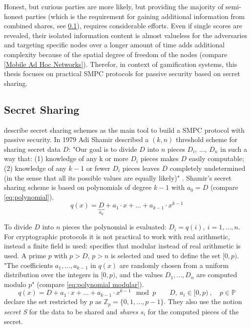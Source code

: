Honest, but curious parties are more likely, but providing the majority of semi-honest parties (which is the requirement for gaining additional information from combined shares, see \ref{Secret Sharing}), requires considerable efforts. Even if single scores are revealed, their isolated information content is almost valueless for the adversaries and targeting specific nodes over a longer amount of time adds additional complexity because of the spatial degree of freedom of the nodes (compare \ref{Mobile Ad Hoc Networks}).
Therefor, in context of gamification systems, this thesis focuses on practical \gls{SMPC} protocols for passive security based on secret sharing.

\subsection{Secret Sharing}	\label{Secret Sharing}

\textcite[p. 32]{Cramer2015} describe secret sharing schemes as the main tool to build a \gls{SMPC} protocol with passive security. In 1979 Adi Shamir described a $(k, n)$ threshold scheme for sharing secret data $D$: "Our goal is to divide $D$ into $n$ pieces $D_i$, ..., $D_n$ in such a way that:
(1) knowledge of any k or more $D_i$ pieces makes $D$ easily computable; (2) knowledge of any $k-1$ or fewer $D_i$ pieces leaves $D$ completely undetermined (in the sense that all its possible values are equally likely)" \autocite{Shamir1979}.
Shamir's secret sharing scheme is based on polynomials of degree $k-1$ with $a_0=D$ (compare \ref{eq:polynomial}). 
\begin{equation}
\label{eq:polynomial}
q(x)=\underbrace{D}_{a_0} + a_1 \cdot x + ... + a_{k-1} \cdot x^{k-1}
\end{equation}

To divide $D$ into $n$ pieces the polynomial is evaluated: $D_i=q(i),\ i=1,...,n$. For cryptographic protocols it is not practical to work with real arithmetic, instead a finite field is used: \textcite{Shamir1979} specifies that modular instead of real arithmetic is used. A prime $p$ with $p>D$, $p>n$ is selected and used to define the set $[0, p)$. "The coefficients $a_1, ..., a_{k-1}$ in $q(x)$ are randomly chosen	from a uniform distribution over the integers in $[0, p)$, and the values $D_1, ..., D_n$ are computed modulo $p$" \autocite[p. 613]{Shamir1979} (compare \ref{eq:polynomial modular}).
\begin{equation}
\label{eq:polynomial modular}
q(x) = D + a_1 \cdot x + ... + a_{k-1} \cdot x^{k-1} \mod p \qquad D,\ a_i \in [0,p)\ , \quad p \in \mathbb{P}
\end{equation}
\textcite[p. 7]{Cramer2015} declare the set restricted by $p$ as $\mathbb{Z}_p = \{0, 1, ..., p-1\}$. They also use the notion \textit{secret S} for the data to be shared and \textit{shares $s_i$} for the computed pieces of the secret.

